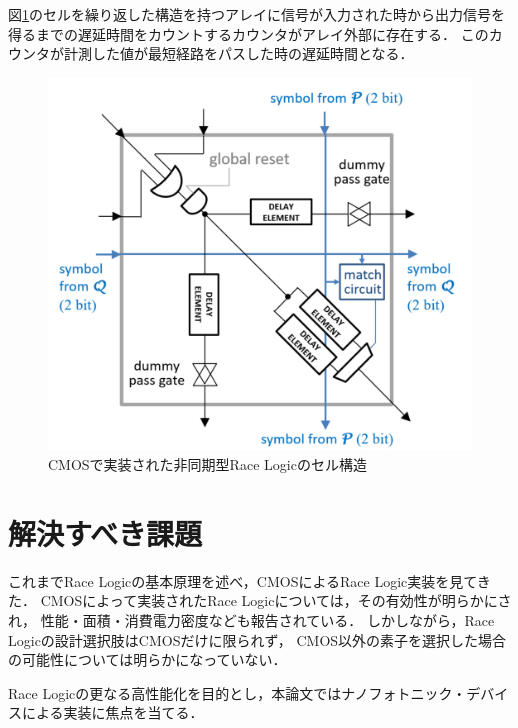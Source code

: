 \begin{itemize}
図\ref{fig:CMOSasync}のセルを繰り返した構造を持つアレイに信号が入力された時から出力信号を得るまでの遅延時間をカウントするカウンタがアレイ外部に存在する．
このカウンタが計測した値が最短経路をパスした時の遅延時間となる．
\begin{figure}[t!]
\begin{center}
\includegraphics[keepaspectratio,scale=0.2]{fig/2/CMOSasync.png}
\caption{CMOSで実装された非同期型Race Logicのセル構造\cite{madhavan20174}}
\label{fig:CMOSasync}
\end{center}
\end{figure}

\end{itemize}

\section{解決すべき課題}
これまでRace Logicの基本原理を述べ，CMOSによるRace Logic実装を見てきた．
CMOSによって実装されたRace Logicについては，その有効性が明らかにされ，
性能・面積・消費電力密度なども報告されている．
しかしながら，Race Logicの設計選択肢はCMOSだけに限られず，
CMOS以外の素子を選択した場合の可能性については明らかになっていない．

Race Logicの更なる高性能化を目的とし，本論文ではナノフォトニック・デバイスによる実装に焦点を当てる．
